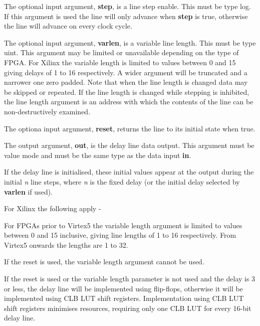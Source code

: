         The optional input argument, {\bf step}, is a line step enable.
        This  must be type log. If this argument is used the line will only
        advance when {\bf step} is true, otherwise the line will advance on
        every clock cycle.

        The optional input argument, {\bf varlen}, is a variable line
        length. This must be type uint. This argument may be limited or
        unavailable depending on the type of FPGA. For Xilinx the variable
        length is limited to values between 0 and 15 giving delays of 1 to 16
        respectively. A wider argument will be truncated and a narrower one
        zero padded. Note that when the line length is changed data may be
        skipped or repeated. If the line length is changed while stepping is
        inhibited, the line length argument is an address with which the
        contents of the line can be non-destructively examined.

        The optiona input argument, {\bf reset}, returns the
        line to its initial state when true.

        The output argument, {\bf out}, is the delay line data output. This
        argument must be value mode and must be the same type as the data
        input {\bf in}.
        
        If the delay line is initialised, these initial values appear at the
        output during the initial {\em n} line steps, where {\em n} is the
        fixed delay (or the initial delay selected by {\bf varlen}
        if used).
        
        For Xilinx the following apply -
        \blist
        \item   For FPGAs prior to Virtex5 the variable length argument is limited to values
                between 0 and 15 inclusive, giving line lengths of 1 to
                16 respectively. From Virtex5 onwards the lengths are 1 to 32.
        \item   If the reset is used, the variable length argument cannot be
                used.
        \item   If the reset is used or the variable length parameter is not
                used and the delay is 3 or less, the delay line will be
                implemented using flip-flops, otherwise it will be implemented
                using CLB LUT shift registers.
        \blend
        Implementation using CLB LUT shift registers minimises resources,
        requiring only one CLB LUT for every 16-bit delay line.
        

